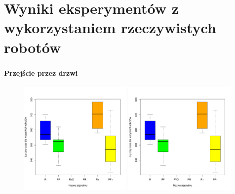 \documentclass{beamer}
\begin{document}
\section{Wyniki eksperymentów z wykorzystaniem  rzeczywistych robotów}
\begin{frame}
\frametitle{\secname}
\framesubtitle{Przejście przez drzwi}

\begin{figure}[!ht]
	\centering
		\includegraphics[page = 1, width=0.49\textwidth]{img/Robots_Passage_through_the_door.pdf}
		\includegraphics[page = 2, width=0.49\textwidth]{img/Robots_Passage_through_the_door.pdf}
\end{figure}



\end{frame}
\end{document}
